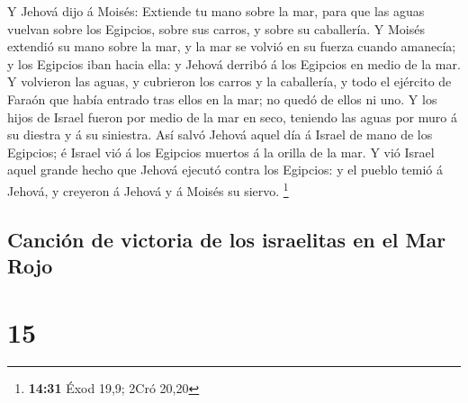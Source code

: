  Y Jehová dijo á Moisés: Extiende tu mano sobre la mar,
para que las aguas vuelvan sobre los Egipcios, sobre sus carros, y sobre
su caballería.  Y Moisés extendió su mano sobre la mar, y
la mar se volvió en su fuerza cuando amanecía; y los Egipcios iban hacia
ella: y Jehová derribó á los Egipcios en medio de la mar.
 Y volvieron las aguas, y cubrieron los carros y la
caballería, y todo el ejército de Faraón que había entrado tras ellos en
la mar; no quedó de ellos ni uno.  Y los hijos de Israel
fueron por medio de la mar en seco, teniendo las aguas por muro á su
diestra y á su siniestra.  Así salvó Jehová aquel día á
Israel de mano de los Egipcios; é Israel vió á los Egipcios muertos á la
orilla de la mar.  Y vió Israel aquel grande hecho que
Jehová ejecutó contra los Egipcios: y el pueblo temió á Jehová, y
creyeron á Jehová y á Moisés su siervo. \footnote{\textbf{14:31} Éxod
  19,9; 2Cró 20,20}

\hypertarget{canciuxf3n-de-victoria-de-los-israelitas-en-el-mar-rojo}{%
\subsection{Canción de victoria de los israelitas en el Mar
Rojo}\label{canciuxf3n-de-victoria-de-los-israelitas-en-el-mar-rojo}}

\hypertarget{section-14}{%
\section{15}\label{section-14}}

